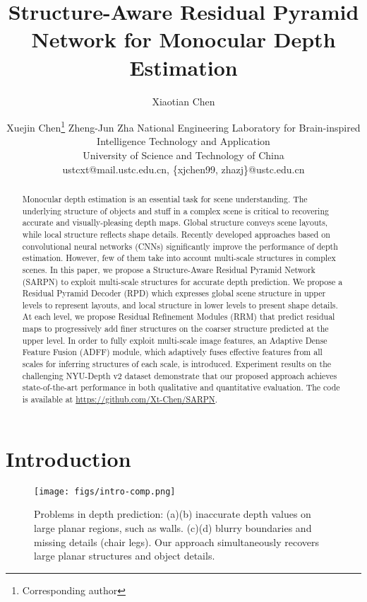 \documentclass{article}
\title{Structure-Aware Residual Pyramid Network for Monocular Depth Estimation}
\author{
Xiaotian Chen
\and
Xuejin Chen\footnote{Corresponding author}\And
Zheng-Jun Zha
\affiliations
National Engineering Laboratory for Brain-inspired Intelligence Technology and Application\\
University of Science and Technology of China\\
\emails
ustcxt@mail.ustc.edu.cn,
\{xjchen99, zhazj\}@ustc.edu.cn
}
\begin{document}
	\maketitle
	\begin{abstract}
		Monocular depth estimation is an essential task for scene understanding. 
		The underlying structure of objects and stuff in a complex scene is critical to recovering accurate and visually-pleasing depth maps.
		Global structure conveys scene layouts, while local structure reflects shape details. 
		Recently developed approaches based on convolutional neural networks (CNNs) significantly improve the performance of depth estimation. 
		However, few of them take into account multi-scale structures in complex scenes.
		In this paper, we propose a Structure-Aware Residual Pyramid Network (SARPN) to exploit multi-scale structures for accurate depth prediction. 
		We propose a Residual Pyramid Decoder (RPD) which expresses global scene structure in upper levels to represent layouts, and local structure in lower levels to present shape details. 
		At each level, we propose Residual Refinement Modules (RRM) that predict residual maps to progressively add finer structures on the coarser structure predicted at the upper level.
		In order to fully exploit multi-scale image features, an Adaptive Dense Feature Fusion (ADFF) module, which adaptively fuses effective features from all scales for inferring structures of each scale, is introduced. 
		Experiment results on the challenging NYU-Depth v2 dataset demonstrate that our proposed approach achieves state-of-the-art performance in both qualitative and quantitative evaluation. The code is available at \url{https://github.com/Xt-Chen/SARPN}.
	\end{abstract}	
	\section{Introduction}
\label{sec:intro}


\begin{figure}[htp]
	\centering 
	\texttt{[image: figs/intro-comp.png]}
	\caption{Problems in depth prediction: (a)(b) inaccurate depth values on large planar regions, such as walls. (c)(d) blurry boundaries and missing details (chair legs). Our approach simultaneously recovers large planar structures and object details.}
	\label{fig:intro-compare}
\end{figure} 
\end{document}

